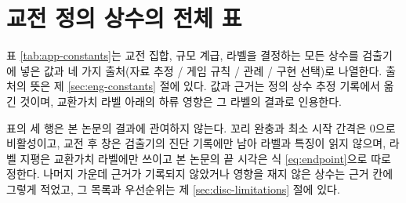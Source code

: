 \chapter{교전 정의 상수의 전체 표}
\label{app:constants}

표 \ref{tab:app-constants}는 교전 집합, 규모 계급, 라벨을 결정하는 모든 상수를 검출기에 넣은 값과 네 가지 출처(자료 추정 / 게임 규칙 / 관례 / 구현 선택)로 나열한다. 출처의 뜻은 제 \ref{sec:eng-constants} 절에 있다. 값과 근거는 정의 상수 추정 기록에서 옮긴 것이며, 교환가치 라벨 아래의 하류 영향은 그 라벨의 결과로 인용한다.

표의 세 행은 본 논문의 결과에 관여하지 않는다. 꼬리 완충과 최소 시작 간격은 0으로 비활성이고, 교전 후 창은 검출기의 진단 기록에만 남아 라벨과 특징이 읽지 않으며, 라벨 지평은 교환가치 라벨에만 쓰이고 본 논문의 끝 시각은 식 \eqref{eq:endpoint}으로 따로 정한다. 나머지 가운데 근거가 기록되지 않았거나 영향을 재지 않은 상수는 근거 칸에 그렇게 적었고, 그 목록과 우선순위는 제 \ref{sec:disc-limitations} 절에 있다.

